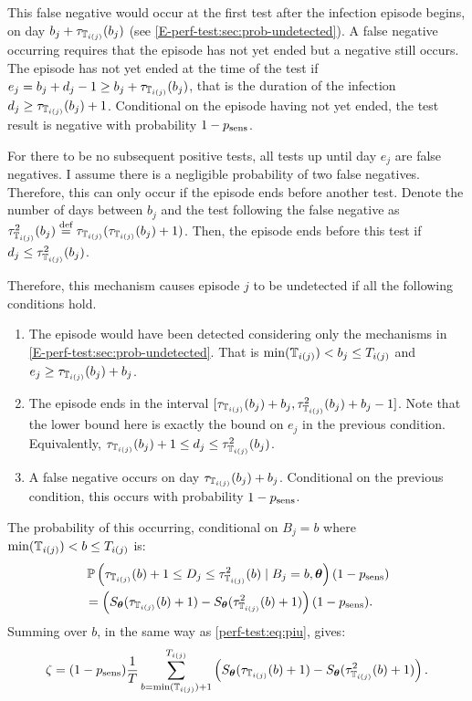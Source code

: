 \documentclass[thesis.tex]{subfiles}
\begin{document}
This false negative would occur at the first test after the infection episode begins, on day $b_j + \tau_{\mathbb{T}_{i(j)}}(b_j)$ (see \cref{E-perf-test:sec:prob-undetected}).
A false negative occurring requires that the episode has not yet ended but a negative still occurs.
The episode has not yet ended at the time of the test if $e_j = b_j + d_j - 1 \geq b_j + \tau_{\mathbb{T}_{i(j)}}(b_j)$, that is the duration of the infection $d_j \geq \tau_{\mathbb{T}_{i(j)}}(b_j) + 1$.
Conditional on the episode having not yet ended, the test result is negative with probability $1 - p_\text{sens}$.

For there to be no subsequent positive tests, all tests up until day $e_j$ are false negatives.
I assume there is a negligible probability of two false negatives.
Therefore, this can only occur if the episode ends before another test.
Denote the number of days between $b_j$ and the test following the false negative as $\tau^2_{\mathbb{T}_{i(j)}}(b_j) \stackrel{\text{def}}{=} \tau_{\mathbb{T}_{i(j)}}(\tau_{\mathbb{T}_{i(j)}}(b_j) + 1)$.
Then, the episode ends before this test if $d_j \leq \tau^2_{\mathbb{T}_{i(j)}}(b_j)$.

Therefore, this mechanism causes episode $j$ to be undetected if all the following conditions hold.
\begin{enumerate}
    \item The episode would have been detected considering only the mechanisms in \cref{E-perf-test:sec:prob-undetected}. That is $\min(\mathbb{T}_{i(j)}) < b_j \leq T_{i(j)}$ and $e_j \geq \tau_{\mathbb{T}_{i(j)}}(b_j) + b_j$.
    \item The episode ends in the interval $[\tau_{\mathbb{T}_{i(j)}}(b_j) + b_j, \tau^2_{\mathbb{T}_{i(j)}}(b_j) + b_j - 1]$.
      Note that the lower bound here is exactly the bound on $e_j$ in the previous condition.
      Equivalently, $\tau_{\mathbb{T}_{i(j)}}(b_j) + 1 \leq d_j \leq \tau^2_{\mathbb{T}_{i(j)}}(b_j)$.
    \item A false negative occurs on day $\tau_{\mathbb{T}_{i(j)}}(b_j) + b_j$. Conditional on the previous condition, this occurs with probability $1 - p_\text{sens}$.
\end{enumerate}

The probability of this occurring, conditional on $B_j = b$ where $\min(\mathbb{T}_{i(j)}) < b \leq T_{i(j)}$ is:
\begin{align}
&\operatorname{\mathbb{P}} \left(
    \tau_{\mathbb{T}_{i(j)}}(b) + 1 \leq D_j \leq \tau^2_{\mathbb{T}_{i(j)}}(b)
    \mid B_j = b, \bm{\theta} \right) (1 - p_\text{sens}) \\
&= \left( S_{\bm{\theta}}(\tau_{\mathbb{T}_{i(j)}}(b) + 1) - S_{\bm{\theta}}(\tau^2_{\mathbb{T}_{i(j)}}(b) + 1) \right) (1 - p_\text{sens}).
\end{align}
Summing over $b$, in the same way as \cref{perf-test:eq:piu}, gives:
\begin{align}
\zeta = (1 - p_\text{sens})\frac{1}{T} \sum_{b=\min(\mathbb{T}_{i(j)}) + 1}^{T_{i(j)}} \left( S_{\bm{\theta}}(\tau_{\mathbb{T}_{i(j)}}(b) + 1) - S_{\bm{\theta}}(\tau^2_{\mathbb{T}_{i(j)}}(b) + 1) \right).
\label{imperf-test:eq:zeta}
\end{align}
\end{document}
